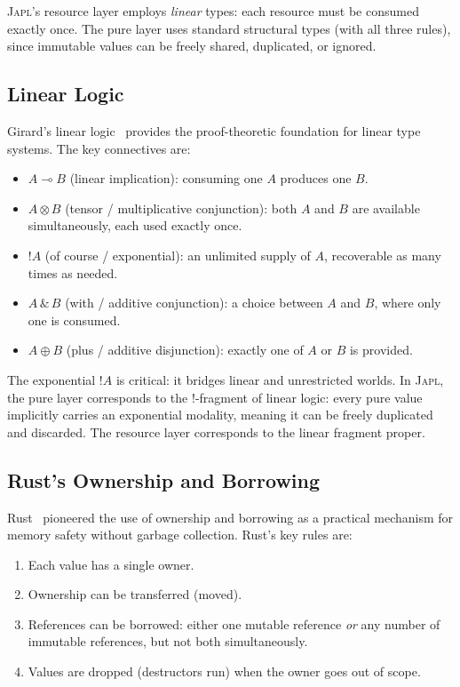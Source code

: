 \documentclass[11pt]{article}
\newcommand{\JAPL}{\textsc{Japl}}
\newcommand{\lolli}{\multimap}
\newcommand{\tensor}{\otimes}
\newcommand{\bang}{{\mathop{!}}}
\begin{document}
\JAPL{}'s resource layer employs \emph{linear} types: each resource
must be consumed exactly once.  The pure layer uses standard
structural types (with all three rules), since immutable values can
be freely shared, duplicated, or ignored.

\subsection{Linear Logic}

Girard's linear logic~\cite{girard1987linear} provides the
proof-theoretic foundation for linear type systems.  The key
connectives are:

\begin{itemize}
  \item $A \lolli B$ (linear implication): consuming one $A$ produces
        one $B$.
  \item $A \tensor B$ (tensor / multiplicative conjunction): both $A$
        and $B$ are available simultaneously, each used exactly once.
  \item $\bang A$ (of course / exponential): an unlimited supply of
        $A$, recoverable as many times as needed.
  \item $A \,\&\, B$ (with / additive conjunction): a choice between
        $A$ and $B$, where only one is consumed.
  \item $A \oplus B$ (plus / additive disjunction): exactly one of $A$
        or $B$ is provided.
\end{itemize}

The exponential $\bang A$ is critical: it bridges linear and
unrestricted worlds.  In \JAPL{}, the pure layer corresponds to the
$\bang$-fragment of linear logic: every pure value implicitly carries
an exponential modality, meaning it can be freely duplicated and
discarded.  The resource layer corresponds to the linear fragment
proper.

\subsection{Rust's Ownership and Borrowing}\label{sec:bg-rust}

Rust~\cite{rust2021} pioneered the use of ownership and borrowing as a
practical mechanism for memory safety without garbage collection.
Rust's key rules are:

\begin{enumerate}
  \item Each value has a single owner.
  \item Ownership can be transferred (moved).
  \item References can be borrowed: either one mutable reference
        \emph{or} any number of immutable references, but not both
        simultaneously.
  \item Values are dropped (destructors run) when the owner goes out of
        scope.
\end{enumerate}
\end{document}
